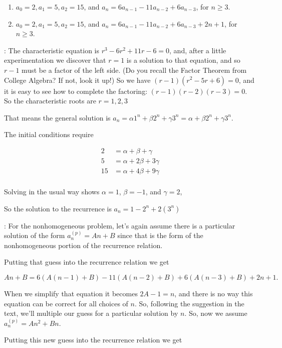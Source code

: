 \documentclass[11pt]{amsart}
\begin{document}
\begin{enumerate}
\begin{enumerate}

\item $a_0=2, a_1=5, a_2 = 15$, and $a_n=6a_{n-1}-11a_{n-2}+6a_{n-3}$, for $n\geq 3$.

\item $a_0=2, a_1=5, a_2 = 15$, and $a_n=6a_{n-1}-11a_{n-2}+6a_{n-3}+2n+1$, for $n\geq 3$.
\end{enumerate}

:  The characteristic equation is $r^3 -6r^2 +11r -6=0$, and, after a little
experimentation we discover that $r=1$ is a solution to that equation, and so $r-1$ must be a factor
of the left side. (Do you recall the Factor Theorem from College Algebra? If not, look it up!)
So we have $(r-1)(r^2 -5r+6)=0$, and it is easy to see how to complete the factoring:
$(r-1)(r-2)(r-3) = 0$. So the characteristic roots are $r=1,2,3$

That means the general solution is 
$a_n = \alpha 1^n +\beta 2^n + \gamma3^n =  \alpha  +\beta 2^n + \gamma3^n$.

The initial conditions require

\begin{align*}
2 &= \alpha + \beta + \gamma\\[5pt]
5 &= \alpha + 2\beta + 3\gamma\\[5pt]
15 &= \alpha + 4\beta + 9\gamma\\
\end{align*}

Solving in the usual way shows $\alpha = 1$, $\beta = -1$, and $\gamma=2$,

So the solution to the recurrence is $a_n = 1-2^n +2 (3^n)$


: For the nonhomogeneous problem, let's again assume there is a 
particular solution of the form $a_n^{(p)} = An +B$ since that is the form of the nonhomogeneous
portion of the recurrence relation.

Putting that guess into the recurrence relation we get

\[
An+B=6(A(n-1)+B)-11(A(n-2)+B)+6(A(n-3)+B)+2n+1.
\]

When we simplify that equation it becomes $2A-1 = n$, and there is no way this equation
can be correct for all choices of $n$. So, following the suggestion in the text, we'll multiple
our guess for a particular solution by $n$. So, now we assume $a_n^{(p)} = An^2+Bn$.

Putting this new guess into the recurrence relation we get


\end{enumerate}
\end{document}
